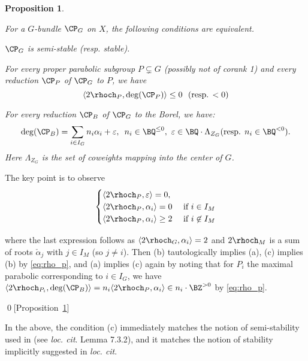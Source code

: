 \documentclass[9pt]{amsart}
\newtheorem{prop}[subsubsection]{Proposition}
\theoremstyle{remark}
\theoremstyle{definition}
\theoremstyle{remark}
\newcommand{\propref}[1]{Proposition~\ref{#1}}
\numberwithin{equation}{section}
\begin{document}
\begin{prop} \label{p:semistab}

For a $G$-bundle $\CP_G$ on $X$, the following conditions are equivalent.

\medskip 

 $\CP_G$ is semi-stable (resp. stable).

 For every proper parabolic subgroup $P \subsetneq G$ (possibly
not of corank 1) and every
reduction $\CP_P$ of $\CP_G$ to $P$, we have
\[
\langle 2\rhoch_P,\deg(\CP_P)\rangle \leq 0 \,\,\,\, \text{(resp. $< 0$)}
\]

 For every reduction $\CP_B$ of $\CP_G$ to the
Borel, we have:
\begin{equation}\label{eq:ss borel}
\deg(\CP_B) = \sum_{i \in I_G} n_i\alpha_i + \varepsilon, 
\,\,\, n_i \in \BQ^{\leq 0}, 
\,\, \varepsilon \in \BQ \cdot \Lambda_{Z_G}
\text{(resp. $n_i \in \BQ^{<0}$)}.
\end{equation}
Here $\Lambda_{Z_G}$ is the set of coweights mapping
into the center of $G$.

\end{prop}

\sssec{Proof of \propref{p:semistab}}

The key point is to observe
\begin{equation}\label{eq:rho_p}
\begin{cases}
\langle 2\rhoch_P,\varepsilon\rangle = 0, & \\
\langle 2\rhoch_P,\alpha_i\rangle = 0 & \text{ if $i \in I_M$} \\
\langle 2\rhoch_P,\alpha_i\rangle \geq 2 & \text{ if $i \not\in I_M$} \\
\end{cases}
\end{equation}

\noindent where the last expression follows as
$\langle 2\rhoch_G,\alpha_i\rangle = 2$ and 
$2\rhoch_M$ is a sum of roots $\check{\alpha}_j$ with 
$j \in I_M$ (so $j \neq i$). Then (b) tautologically implies
(a), (c) implies (b) by \eqref{eq:rho_p}, and
(a) implies (c) again by noting that for $P_i$ the 
maximal parabolic corresponding to $i \in I_G$, 
we have $\langle 2\rhoch_{P_i},\deg(\CP_B)\rangle = 
n_i \langle 2\rhoch_P,\alpha_i\rangle \in n_i \cdot \BZ^{>0}$
by \eqref{eq:rho_p}.

\qed[\propref{p:semistab}]

\sssec{}

In the above, the condition (c) immediately matches the notion of
semi-stability used in \cite{DG} (see \emph{loc. cit}. Lemma 7.3.2),
and it matches the notion of stability implicitly suggested in \emph{loc. cit}. 
\end{document}
